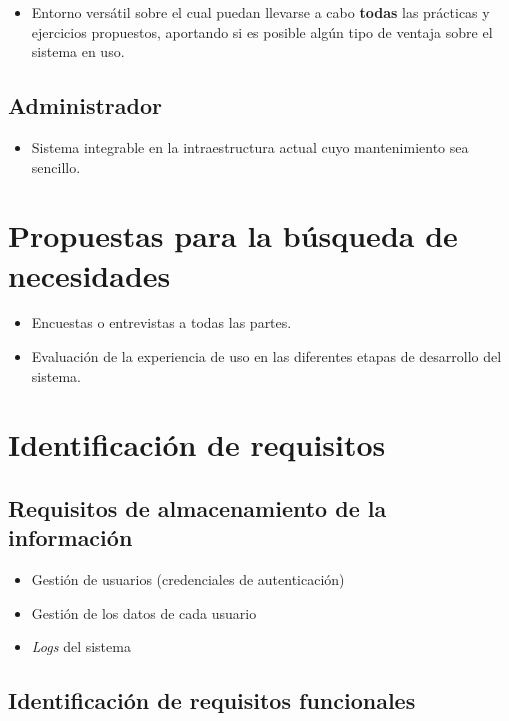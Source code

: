 \documentclass{article}
\begin{document}
\begin{itemize}
  \item Entorno versátil sobre el cual puedan llevarse a cabo \textbf{todas} las prácticas y ejercicios propuestos, aportando si es posible algún tipo de ventaja sobre el sistema en uso.
\end{itemize}
\subsection{Administrador}
\begin{itemize}
  \item Sistema integrable en la intraestructura actual cuyo mantenimiento sea sencillo.
\end{itemize}

\section{Propuestas para la búsqueda de necesidades}

\begin{itemize}
  \item Encuestas o entrevistas a todas las partes.
  \item Evaluación de la experiencia de uso en las diferentes etapas de desarrollo del sistema.
\end{itemize}

\section{Identificación de requisitos}

\subsection{Requisitos de almacenamiento de la información}

\begin{itemize}
  \item Gestión de usuarios (credenciales de autenticación)
  \item Gestión de los datos de cada usuario
  \item \textit{Logs} del sistema
\end{itemize}

\subsection{Identificación de requisitos funcionales}
\end{document}

